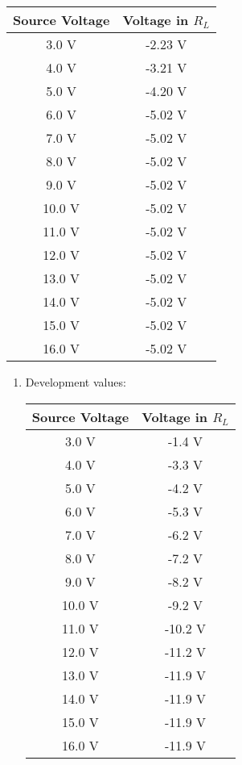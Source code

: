 \begin{tasks}
\begin{multicols}{2}
\begin{enumerate}
\begin{center}
\begin{tabular}[.5cm]{ c c }
\toprule
Source Voltage & Voltage in $R_{L}$ \\
\midrule
3.0 V & -2.23 V \\
\cmidrule{1-2}
4.0 V & -3.21 V \\
\cmidrule{1-2}
5.0 V & -4.20 V \\
\cmidrule{1-2}
6.0 V & -5.02 V \\
\cmidrule{1-2}
7.0 V & -5.02 V \\
\cmidrule{1-2}
8.0 V & -5.02 V \\
\cmidrule{1-2}
9.0 V & -5.02 V \\
\cmidrule{1-2}
10.0 V & -5.02 V \\
\cmidrule{1-2}
11.0 V & -5.02 V \\
\cmidrule{1-2}
12.0 V & -5.02 V \\
\cmidrule{1-2}
13.0 V & -5.02 V \\
\cmidrule{1-2}
14.0 V & -5.02 V \\
\cmidrule{1-2}
15.0 V & -5.02 V \\
\cmidrule{1-2}
16.0 V & -5.02 V \\
\bottomrule
\end{tabular}
\end{center} 
\end{enumerate}
\end{multicols}


\begin{multicols}{2}

\begin{enumerate}
\item Development values:

\begin{center}
\begin{tabular}[.5cm]{ c c }
\toprule
Source Voltage & Voltage in $R_{L}$ \\
\midrule
3.0 V & -1.4 V \\
\cmidrule{1-2}
4.0 V & -3.3 V \\
\cmidrule{1-2}
5.0 V & -4.2 V \\
\cmidrule{1-2}
6.0 V & -5.3 V \\
\cmidrule{1-2}
7.0 V & -6.2 V \\
\cmidrule{1-2}
8.0 V & -7.2 V \\
\cmidrule{1-2}
9.0 V & -8.2 V \\
\cmidrule{1-2}
10.0 V & -9.2 V \\
\cmidrule{1-2}
11.0 V & -10.2 V \\
\cmidrule{1-2}
12.0 V & -11.2 V \\
\cmidrule{1-2}
13.0 V & -11.9 V \\
\cmidrule{1-2}
14.0 V & -11.9 V \\
\cmidrule{1-2}
15.0 V & -11.9 V \\
\cmidrule{1-2}
16.0 V & -11.9 V \\
\bottomrule
\end{tabular}
\end{center} 


\end{enumerate}
\end{multicols}
\end{tasks}
